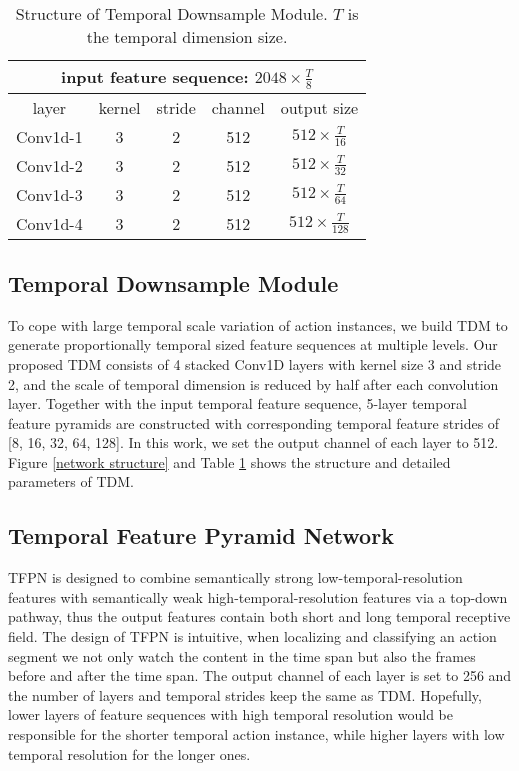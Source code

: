 \documentclass[final]{cvpr}
\begin{document}
\begin{table}[htbp]
    \caption{Structure of Temporal Downsample Module. $T$ is the temporal dimension size.}
    \centering
    \begin{tabular} { c | c c c | c }
        \toprule
        \multicolumn{5}{c}{input feature sequence: $2048 \times \frac{T}{8}$}\\
        \midrule
        layer & kernel & stride & channel & output size\\
        \midrule
        Conv1d-1 & 3 & 2 & 512 & $ 512 \times \frac{T}{16} $ \\
        \midrule
        Conv1d-2 & 3 & 2 & 512 & $ 512 \times \frac{T}{32} $ \\
        \midrule
        Conv1d-3 & 3 & 2 & 512 & $ 512 \times \frac{T}{64} $ \\
        \midrule
        Conv1d-4 & 3 & 2 & 512 & $ 512 \times \frac{T}{128} $ \\

        \bottomrule
    \end{tabular}
    \label{tab:TDM}
\end{table}

\subsection{Temporal Downsample Module}
To cope with large temporal scale variation of action instances, we build TDM to generate proportionally temporal sized feature sequences at multiple levels. Our proposed TDM consists of 4 stacked Conv1D layers with kernel size 3 and stride 2, and the scale of temporal dimension is reduced by half after each convolution layer. Together with the input temporal feature sequence, 5-layer temporal feature pyramids are constructed with corresponding temporal feature strides of [8, 16, 32, 64, 128]. In this work, we set the output channel of each layer to 512. Figure \ref{network structure} and Table \ref{tab:TDM} shows the structure and detailed parameters of TDM.
 
\subsection{Temporal Feature Pyramid Network}
TFPN is designed to combine semantically strong low-temporal-resolution features with semantically weak high-temporal-resolution features via a top-down pathway, thus the output features contain both short and long temporal  receptive field. The design of TFPN is intuitive, when localizing and classifying an action segment we not only watch the content in the time span but also the frames before and after the time span.
The output channel of each layer is set to 256 and the number of layers and temporal strides keep the same as TDM. Hopefully, lower layers of feature sequences with high temporal resolution would be responsible for the shorter temporal action instance, while higher layers with low temporal resolution for the longer ones. 
\end{document}
